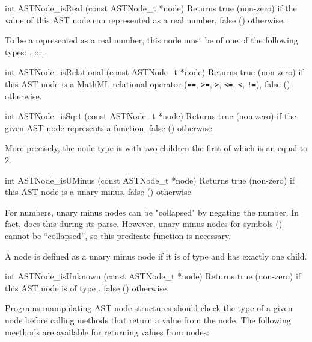 \documentclass{sbmlmanual}
\begin{document}
\begin{methoddef}{int ASTNode\_isReal (const ASTNode\_t *node)}
  Returns true (non-zero) if the value of this AST node can represented as
  a real number, false () otherwise.
 
  To be a represented as a real number, this node must be of one of the
  following types: ,  or
  .
\end{methoddef}


\begin{methoddef}{int ASTNode\_isRelational (const ASTNode\_t *node)}
  Returns true (non-zero) if this AST node is a MathML relational operator
  (\verb|==|, \verb|>=|, \verb|>|, \verb|<=|, \verb|<|, \verb|!=|), false
  () otherwise.
\end{methoddef}


\begin{methoddef}{int ASTNode\_isSqrt (const ASTNode\_t *node)}
  Returns true (non-zero) if the given AST node represents a 
  function, false () otherwise.
 
  More precisely, the node type is  with two
  children the first of which is an  equal to 2.
\end{methoddef}


\begin{methoddef}{int ASTNode\_isUMinus (const ASTNode\_t *node)}
  Returns true (non-zero) if this AST node is a unary minus, false ()
  otherwise.
 
  For numbers, unary minus nodes can be "collapsed" by negating the number.
  In fact,  does this during its parse.
  However, unary minus nodes for symbols () cannot be
  ``collapsed'', so this predicate function is necessary.
 
  A node is defined as a unary minus node if it is of type
   and has exactly one child.
\end{methoddef}


\begin{methoddef}{int ASTNode\_isUnknown (const ASTNode\_t *node)}
  Returns true (non-zero) if this AST node is of type ,
  false () otherwise.
\end{methoddef}



Programs manipulating AST node structures should check the type of a given
node before calling methods that return a value from the node.  The
following meethods are available for returning values from nodes:
\end{document}
